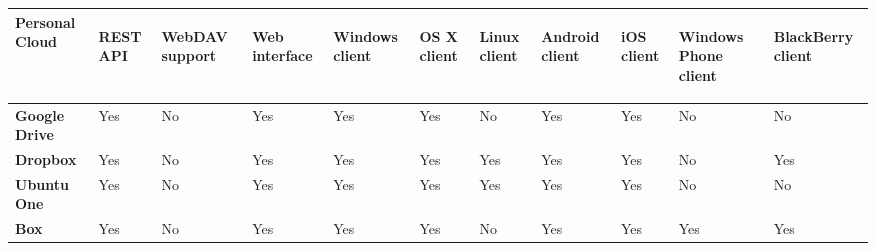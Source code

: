 {
\def\arraystretch{1.5}

\begin{table}
\begin{center}
    \begin{tabular}{ | p{3.0cm} | p{0.9cm} | p{0.9cm} | p{0.9cm} | p{0.9cm} | p{0.9cm} | p{0.9cm} | p{0.9cm} | p{0.9cm} | p{0.9cm} | p{0.9cm} | }
    \hline
    \rowcolor[gray]{0.8}

	\textbf{Personal Cloud} &
	\begin{sideways}\textbf{REST API}\end{sideways} &
	\begin{sideways}\textbf{WebDAV support}\end{sideways} &
	\begin{sideways}\textbf{Web interface}\end{sideways} & 
	\begin{sideways}\textbf{Windows client}\end{sideways} &
	\begin{sideways}\textbf{OS X client}\end{sideways} &
	\begin{sideways}\textbf{Linux client}\end{sideways} &
	\begin{sideways}\textbf{Android client}\end{sideways} &
	\begin{sideways}\textbf{iOS client}\end{sideways} &
	\begin{sideways}\textbf{Windows Phone client}\end{sideways} &
	\begin{sideways}\textbf{BlackBerry client}\end{sideways} 	\\ \hline

	\textbf{Google Drive} &
	Yes &
	No &
	Yes &
	Yes &
	Yes &
	No &
	Yes &
	Yes &
	No &
	No \\ \hline

	\textbf{Dropbox} &
	Yes &
	No &
	Yes &
	Yes &
	Yes &
	Yes &
	Yes &
	Yes &
	No &
	Yes \\ \hline
	
	\textbf{Ubuntu One} &
	Yes &
	No &
	Yes &
	Yes &
	Yes &
	Yes &
	Yes &
	Yes &
	No &
	No \\ \hline
	
	\textbf{Box} &
	Yes &
	No &
	Yes &
	Yes &
	Yes &
	No &
	Yes &
	Yes &
	Yes &
	Yes \\ \hline
	

\end{tabular}
\end{center}
\end{table}}
